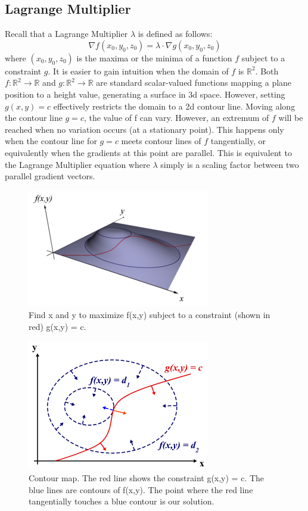\documentclass{article}
\begin{document}
\subsection{Lagrange Multiplier}
Recall that a Lagrange Multiplier $\lambda$ is defined as follows:
\begin{equation}
\nabla f(x_0, y_0, z_0) = \lambda \cdot \nabla g(x_0, y_0, z_0)
\end{equation}
where $(x_0, y_0, z_0)$ is the maxima or the minima of a function $f$ subject to a constraint $g$. It is easier to gain intuition when the domain of $f$ is $\mathbb{R}^2$. Both $f : \mathbb{R}^2 \rightarrow \mathbb{R}$ and $g : \mathbb{R}^2 \rightarrow \mathbb{R}$ are standard scalar-valued functions mapping a plane position to a height value, generating a surface in 3d space. However, setting $g(x,y)=c$ effectively restricts the domain to a 2d contour line. Moving along the contour line $g=c$, the value of f can vary. However, an extremum of $f$ will be reached when no variation occurs (at a stationary point). This happens only when the contour line for $g=c$ meets contour lines of $f$ tangentially, or equivalently when the gradients at this point are parallel. This is equivalent to the Lagrange Multiplier equation where $\lambda$ simply is a scaling factor between two parallel gradient vectors.
\begin{figure}[H]
    \centering
    \includegraphics[scale=0.7]{img/LagrangeMultipliers3D.png}
    \caption{Find x and y to maximize f(x,y) subject to a constraint (shown in red) g(x,y) = c.}
\end{figure}
\begin{figure}[H]
    \centering
    \includegraphics[scale=0.6]{img/LagrangeMultipliers2D.png}
    \caption{Contour map. The red line shows the constraint g(x,y) = c. The blue lines are contours of f(x,y). The point where the red line tangentially touches a blue contour is our solution.}
\end{figure}
\end{document}
